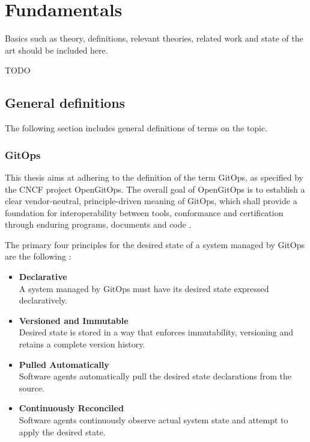 \chapter{Fundamentals} 	%

Basics such as theory, definitions, relevant theories, related work and state of the art should be included here.

TODO

\section{General definitions}

The following section includes general definitions of terms on the topic.

\subsection*{GitOps}

This thesis aims at adhering to the definition of the term GitOps,
as specified by the CNCF project OpenGitOps.
The overall goal of OpenGitOps is to establish a clear vendor-neutral,
principle-driven meaning of GitOps,
which shall provide a foundation for interoperability between tools, conformance and certification through enduring programs, documents and code
\autocite{opengitopsDocuments}.

\noindent
The primary four principles
for the desired state of a
system managed by GitOps are the following \autocite{gitopsPrinciplesv100}:

\begin{itemize}
	\item \textbf{Declarative} \\
		A system managed by GitOps must have its desired state expressed declaratively.
	\item \textbf{Versioned and Immutable} \\
		Desired state is stored in a way that enforces immutability, versioning and retains a complete version history.
	\item \textbf{Pulled Automatically} \\
		Software agents automatically pull the desired state declarations from the source.
	\item \textbf{Continuously Reconciled} \\
		Software agents continuously observe actual system state and attempt to apply the desired state.
\end{itemize}

